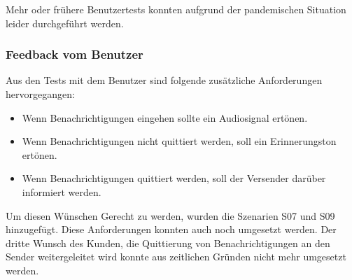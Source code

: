 Mehr oder frühere Benutzertests konnten aufgrund der pandemischen Situation leider durchgeführt werden.

\subsubsection*{Feedback vom Benutzer}

Aus den Tests mit dem Benutzer sind folgende zusätzliche Anforderungen hervorgegangen:

\begin{itemize}
    \item Wenn Benachrichtigungen eingehen sollte ein Audiosignal ertönen.
    \item Wenn Benachrichtigungen nicht quittiert werden, soll ein Erinnerungston ertönen.
    \item Wenn Benachrichtigungen quittiert werden, soll der Versender darüber informiert werden.
\end{itemize}

Um diesen Wünschen Gerecht zu werden, wurden die Szenarien S07 und S09 hinzugefügt.
Diese Anforderungen konnten auch noch umgesetzt werden.
Der dritte Wunsch des Kunden, die Quittierung von Benachrichtigungen an den Sender weitergeleitet wird konnte aus zeitlichen Gründen nicht mehr umgesetzt werden.

\clearpage

